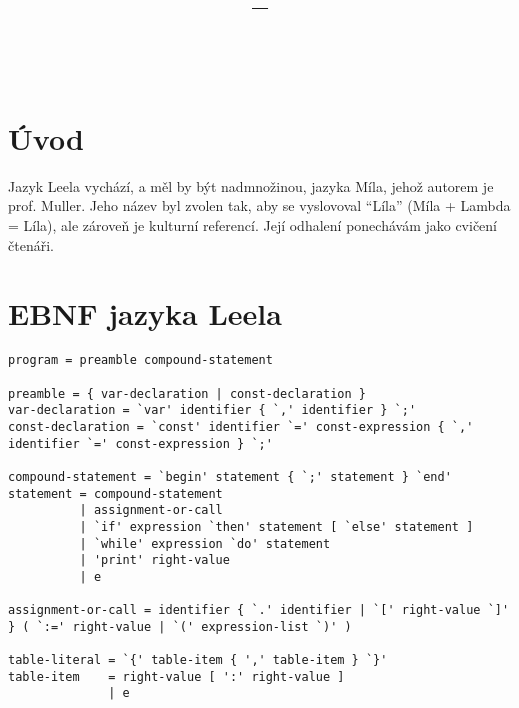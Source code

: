 \documentclass[10pt,a4paper]{article}
\title{\vspace{1in}\paperTitle\\
\small{\paperClass -- \paperType}\vspace{0.5in}}
\author{\paperAuthorName\\
\small\texttt{{\href{mailto:\paperAuthorEmail}{\paperAuthorEmail}}}}
\begin{document}
\maketitle
\newpage

\tableofcontents
\newpage

\section{Úvod}
\label{sec:uvod}

Jazyk Leela vychází, a měl by být nadmnožinou, jazyka Míla, jehož autorem
je prof. Muller. Jeho název byl zvolen tak, aby se vyslovoval ``Líla''
(Míla + Lambda = Líla), ale zároveň je kulturní referencí. Její odhalení
ponechávám jako cvičení čtenáři.

\section{EBNF jazyka Leela}
\label{sec:ebnf}

\begin{lstlisting}
program = preamble compound-statement

preamble = { var-declaration | const-declaration }
var-declaration = `var' identifier { `,' identifier } `;'
const-declaration = `const' identifier `=' const-expression { `,' identifier `=' const-expression } `;'

compound-statement = `begin' statement { `;' statement } `end'
statement = compound-statement
          | assignment-or-call
          | `if' expression `then' statement [ `else' statement ]
          | `while' expression `do' statement
          | 'print' right-value
          | e

assignment-or-call = identifier { `.' identifier | `[' right-value `]' } ( `:=' right-value | `(' expression-list `)' )

table-literal = `{' table-item { ',' table-item } `}'
table-item    = right-value [ ':' right-value ]
              | e

\end{lstlisting}
\end{document}
